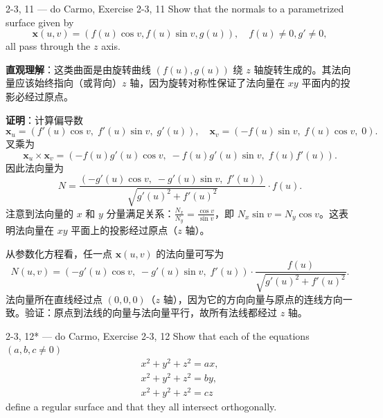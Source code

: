 \begin{exercise}{2-3, 11 — do Carmo, Exercise 2-3, 11}
Show that the normals to a parametrized surface given by
\[
\mathbf{x}(u, v) = (f(u) \cos v, f(u) \sin v, g(u)), \quad f(u) \neq 0, g' \neq 0,
\]
all pass through the $z$ axis.\end{exercise}

\begin{solution}
\textbf{直观理解}：这类曲面是由旋转曲线 $(f(u), g(u))$ 绕 $z$ 轴旋转生成的。其法向量应该始终指向（或背向）$z$ 轴，因为旋转对称性保证了法向量在 $xy$ 平面内的投影必经过原点。

\textbf{证明}：计算偏导数
\[
\mathbf{x}_u = (f'(u)\cos v,\; f'(u)\sin v,\; g'(u)), \quad \mathbf{x}_v = (-f(u)\sin v,\; f(u)\cos v,\; 0).
\]
叉乘为
\[
\mathbf{x}_u \times \mathbf{x}_v = (-f(u)g'(u)\cos v,\; -f(u)g'(u)\sin v,\; f(u)f'(u)).
\]
因此法向量为
\[
N = \frac{(-g'(u)\cos v,\; -g'(u)\sin v,\; f'(u))}{\sqrt{g'(u)^2 + f'(u)^2}} \cdot f(u).
\]
注意到法向量的 $x$ 和 $y$ 分量满足关系：$\frac{N_x}{N_y} = \frac{\cos v}{\sin v}$，即 $N_x \sin v = N_y \cos v$。这表明法向量在 $xy$ 平面上的投影经过原点（$z$ 轴）。

从参数化方程看，任一点 $\mathbf{x}(u,v)$ 的法向量可写为
\[
N(u,v) = (-g'(u)\cos v,\; -g'(u)\sin v,\; f'(u)) \cdot \frac{f(u)}{\sqrt{g'(u)^2 + f'(u)^2}}.
\]
法向量所在直线经过点 $(0,0,0)$（$z$ 轴），因为它的方向向量与原点的连线方向一致。验证：原点到法线的向量与法向量平行，故所有法线都经过 $z$ 轴。
\end{solution}

\begin{exercise}{2-3, 12* — do Carmo, Exercise 2-3, 12}
Show that each of the equations $(a, b, c \neq 0)$
\[
\begin{array}{l} x^2 + y^2 + z^2 = ax, \\ x^2 + y^2 + z^2 = by, \\ x^2 + y^2 + z^2 = cz \end{array}
\]
define a regular surface and that they all intersect orthogonally.
\end{exercise}

